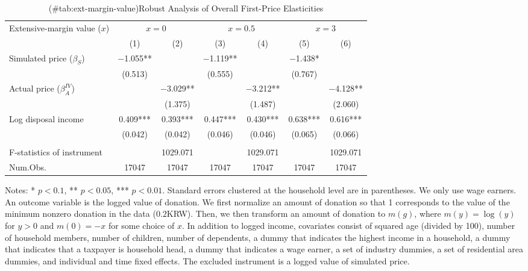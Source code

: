 \begin{table}

\caption{(\#tab:ext-margin-value)Robust Analysis of Overall First-Price Elasticities}
\centering
\fontsize{8}{10}\selectfont
\begin{threeparttable}
\begin{tabular}[t]{lcccccc}
\toprule
\multicolumn{1}{c}{Extensive-margin value ($x$)} & \multicolumn{2}{c}{$x = 0$} & \multicolumn{2}{c}{$x = 0.5$} & \multicolumn{2}{c}{$x = 3$} \\
\cmidrule(l{3pt}r{3pt}){1-1} \cmidrule(l{3pt}r{3pt}){2-3} \cmidrule(l{3pt}r{3pt}){4-5} \cmidrule(l{3pt}r{3pt}){6-7}
  & (1) & (2) & (3) & (4) & (5) & (6)\\
\midrule
Simulated price ($\beta_S$) & \num{-1.055}** &  & \num{-1.119}** &  & \num{-1.438}* & \\
 & (\num{0.513}) &  & (\num{0.555}) &  & (\num{0.767}) & \\
Actual price ($\beta^{IV}_A$) &  & \num{-3.029}** &  & \num{-3.212}** &  & \num{-4.128}**\\
 &  & (\num{1.375}) &  & (\num{1.487}) &  & (\num{2.060})\\
Log disposal income & \num{0.409}*** & \num{0.393}*** & \num{0.447}*** & \num{0.430}*** & \num{0.638}*** & \num{0.616}***\\
 & (\num{0.042}) & (\num{0.042}) & (\num{0.046}) & (\num{0.046}) & (\num{0.065}) & (\num{0.066})\\
\midrule
\addlinespace[0.3em]
\multicolumn{7}{l}{\textit{1st stage information (Excluded instrument: Simulated price)}}\\
\hspace{1em}F-statistics of instrument &  & \num{1029.071} &  & \num{1029.071} &  & \num{1029.071}\\
Num.Obs. & \num{17047} & \num{17047} & \num{17047} & \num{17047} & \num{17047} & \num{17047}\\
\bottomrule
\end{tabular}
\begin{tablenotes}
\item Notes: * $p < 0.1$, ** $p < 0.05$, *** $p < 0.01$. Standard errors clustered at the household level are in parentheses. We only use wage earners. An outcome variable is the logged value of donation. We first normalize an amount of donation so that 1 corresponds to the value of the minimum nonzero donation in the data ($0.2$KRW). Then, we then transform an amount of donation to $m(g)$, where $m(y) = \log(y)$ for $y > 0$ and $m(0) = -x$ for some choice of $x$. In addition to logged income, covariates consist of squared age (divided by 100), number of household members, number of children, number of dependents, a dummy that indicates the highest income in a household, a dummy that indicates that a taxpayer is household head, a dummy that indicates a wage earner, a set of industry dummies, a set of residential area dummies, and individual and time fixed effects. The excluded instrument is a logged value of simulated price.
\end{tablenotes}
\end{threeparttable}
\end{table}
